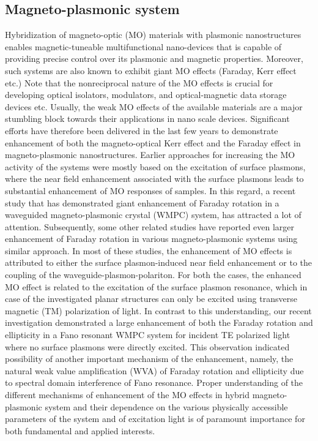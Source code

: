 \documentclass[13pt]{article}
\begin{document}
\subsection{Magneto-plasmonic system}
\noindent
\par
	Hybridization of magneto-optic (MO) materials with plasmonic nanostructures enables magnetic-tuneable multifunctional nano-devices that is capable of providing precise control over its plasmonic and magnetic properties. Moreover, such systems are also known to exhibit giant MO effects (Faraday, Kerr effect etc.) Note that the nonreciprocal nature of the MO effects is crucial for developing optical isolators, modulators, and optical-magnetic data storage devices etc. Usually, the weak MO effects of the available materials are a major stumbling block towards their applications in nano scale devices. Significant efforts have therefore been delivered in the last few years to demonstrate enhancement of both the magneto-optical Kerr effect and the Faraday effect in magneto-plasmonic nanostructures. Earlier approaches for increasing the MO activity of the systems were mostly based on the excitation of surface plasmons, where the near field enhancement associated with the surface plasmons leads to substantial enhancement of MO responses of samples. In this regard, a recent study that has demonstrated giant enhancement of Faraday rotation in a waveguided magneto-plasmonic crystal (WMPC) system, has attracted a lot of attention. Subsequently, some other related studies have reported even larger enhancement of Faraday rotation in various magneto-plasmonic systems using similar approach. In most of these studies, the enhancement of MO effects is attributed to either the surface plasmon-induced near field enhancement or to the coupling of the waveguide-plasmon-polariton. For both the cases, the enhanced MO effect is related to the excitation of the surface plasmon resonance, which in case of the investigated planar structures can only be excited using transverse magnetic (TM) polarization of light. In contrast to this understanding, our recent investigation demonstrated a large enhancement of both the Faraday rotation and ellipticity in a Fano resonant WMPC system for incident TE polarized light where no surface plasmons were directly excited. This observation indicated possibility of another important mechanism of the enhancement, namely, the natural weak value amplification (WVA) of Faraday rotation and ellipticity due to spectral domain interference of Fano resonance. Proper understanding of the different mechanisms of enhancement of the MO effects in hybrid magneto-plasmonic system and their dependence on the various physically accessible parameters of the system and of excitation light is of paramount importance for both fundamental and applied interests.
\end{document}
